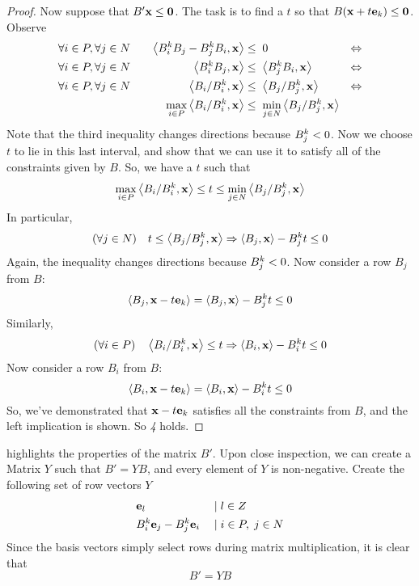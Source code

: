 \begin{proof}
	Now suppose that $B'\mathbf{x} \leq \mathbf{0}$.  The task is to find a $t$ so that $B(\mathbf{x}+t\mathbf{e}_k)\leq \mathbf{0}$.  Observe
	\begin{alignat*}{3}
		\forall i\in P,\forall j \in N & \quad & \left\langle B^k_i B_j - B^k_j B_i, \mathbf{x} \right\rangle    & \leq  \; 0                                & \Leftrightarrow \\
		\forall i\in P,\forall j \in N & \quad & \left\langle B^k_i B_j, \mathbf{x} \right\rangle               & \leq  \; \left\langle B^k_j B_i, \mathbf{x} \right\rangle                & \Leftrightarrow \\
		\forall i\in P,\forall j \in N & \quad & \left\langle B_i/B^k_i, \mathbf{x} \right\rangle               & \leq  \; \left\langle B_j/B^k_j, \mathbf{x} \right\rangle                & \Leftrightarrow \\
		      & \quad & \max_{i\in P} \left\langle B_i/B^k_i, \mathbf{x} \right\rangle & \leq  \; \min_{j\in N}  \left\langle B_j/B^k_j, \mathbf{x} \right\rangle &
	\end{alignat*}
	Note that the third inequality changes directions because $B^k_j < 0$.  Now we choose $t$ to lie in this last interval, and show that we can use it to satisfy all of the constraints given by $ B$.  So, we have a $t$ such that
	\[ \max_{i\in P} \left\langle B_i/B^k_i, \mathbf{x} \right\rangle \leq t \leq \min_{j\in N} \left\langle B_j/B^k_j, \mathbf{x} \right\rangle \]
	In particular,
  \[(\forall j\in N)\quad t \leq \left\langle B_j/B^k_j, \mathbf{x} \right\rangle \Rightarrow \left\langle B_j, \mathbf{x} \right\rangle - B^k_j t \leq 0\]
	Again, the inequality changes directions because $B^k_j < 0$.  Now consider a row $ B_j$ from $ B$:
	\[ \left\langle B_j, \mathbf{x}-t\mathbf{e}_k \right\rangle =  \left\langle B_j, \mathbf{x} \right\rangle - B^k_j t \leq 0 \]
	Similarly,
  \[(\forall i\in P)\quad \left\langle B_i/B^k_i, \mathbf{x} \right\rangle \leq t \Rightarrow \left\langle B_i, \mathbf{x} \right\rangle - B^k_i t \leq 0 \]
	Now consider a row $ B_i$ from $ B$:
	\[ \left\langle B_i, \mathbf{x}-t\mathbf{e}_k \right\rangle =  \left\langle B_i, \mathbf{x} \right\rangle - B^k_i t \leq 0 \]
	So, we've demonstrated that $\mathbf{x}-t\mathbf{e}_k$ satisfies all the constraints from $B$, and the left implication is shown.  So \textit{4} holds.
\end{proof}

\begin{Remark}\label{fm_matrix}
	  highlights the properties of the matrix $B'$.  Upon close inspection, we can create a Matrix $Y$ such that $B' = YB$, and every element of $Y$ is non-negative.  Create the following set of row vectors $Y$
	\begin{alignat*}{2}
		 & \mathbf{e}_l                  & \;|\; & l \in Z          \\
		 & B^k_i \mathbf{e}_j - B^k_j \mathbf{e}_i & \;|\; & i\in P,\; j\in N
	\end{alignat*}
	Since the basis vectors simply select rows during matrix multiplication, it is clear that
	\[ B' = YB \]
\end{Remark}

